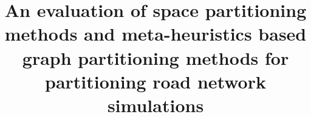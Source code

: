 \documentclass{wscpaperproc}
\theoremstyle{wsc}
\begin{document}
%
%

\title{An evaluation of space partitioning methods and meta-heuristics based graph partitioning methods for partitioning road network simulations}

\end{document}
